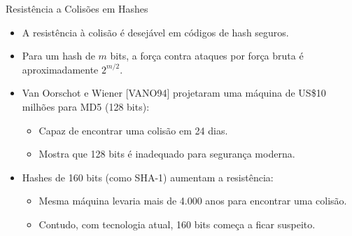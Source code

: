 \begin{frame}{Resistência a Colisões em Hashes}
    \begin{itemize}
        \item A resistência à colisão é desejável em códigos de hash seguros.
        \item Para um hash de $m$ bits, a força contra ataques por força bruta é aproximadamente $2^{m/2}$.
        \item Van Oorschot e Wiener [VANO94] projetaram uma máquina de US\$10 milhões para MD5 (128 bits):
              \begin{itemize}
                  \item Capaz de encontrar uma colisão em 24 dias.
                  \item Mostra que 128 bits é inadequado para segurança moderna.
              \end{itemize}
        \item Hashes de 160 bits (como SHA-1) aumentam a resistência:
              \begin{itemize}
                  \item Mesma máquina levaria mais de 4.000 anos para encontrar uma colisão.
                  \item Contudo, com tecnologia atual, 160 bits começa a ficar suspeito.
              \end{itemize}

    \end{itemize}
\end{frame}

